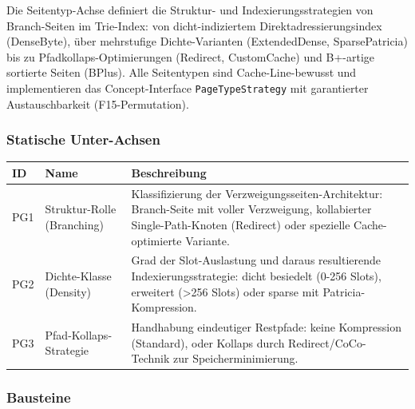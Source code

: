 Die Seitentyp-Achse definiert die Struktur- und Indexierungsstrategien von Branch-Seiten im Trie-Index: von dicht-indiziertem Direktadressierungsindex (Dense\allowbreak{}Byte), über mehrstufige Dichte-Varianten (Extended\allowbreak{}Dense, Sparse\allowbreak{}Patricia) bis zu Pfadkollaps-Optimierungen (Redirect, Custom\allowbreak{}Cache) und B+-artige sortierte Seiten (BPlus). Alle Seitentypen sind Cache-Line-bewusst und implementieren das Concept-Interface \texttt{Page\allowbreak{}Type\allowbreak{}Strategy} mit garantierter Austauschbarkeit (F15-Permutation).

\subsubsection*{Statische Unter-Achsen}

\begin{scriptsize}
\begin{longtable}{@{}>{\raggedright\arraybackslash}p{1.8cm} >{\raggedright\arraybackslash}p{3.2cm} >{\raggedright\arraybackslash}p{8.5cm}@{}}
\toprule
ID & Name & Beschreibung \\
\midrule
\endhead%
PG1 & Struktur-Rolle (Branching) & Klassifizierung der Verzweigungsseiten-Architektur: Branch-Seite mit voller Verzweigung, kollabierter Single-Path-Knoten (Redirect) oder spezielle Cache-optimierte Variante. \\
PG2 & Dichte-Klasse (Density) & Grad der Slot-Auslastung und daraus resultierende Indexierungsstrategie: dicht besiedelt (0-256 Slots), erweitert (>256 Slots) oder sparse mit Patricia-Kompression. \\
PG3 & Pfad-Kollaps-Strategie & Handhabung eindeutiger Restpfade: keine Kompression (Standard), oder Kollaps durch Redirect/\allowbreak{}Co\allowbreak{}Co-Technik zur Speicherminimierung. \\
\bottomrule
\end{longtable}
\end{scriptsize}

\subsubsection*{Bausteine}

